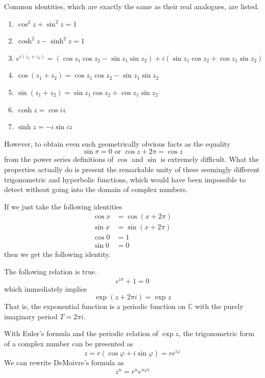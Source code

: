 \documentclass{article}
\begin{document}
    \begin{lemma}
      Common identities, which are exactly the same as their real analogues, are listed. 
      \begin{enumerate}
        \item $\cos^2{z} + \sin^2 {z} = 1$
        \item $\cosh^2{z} - \sinh^2{z} = 1$ 
        \item $e^{i(z_1 + z_2)} = (\cos{z_1} \cos{z_2} - \sin{z_1} \sin{z_2}) + i (\sin{z_1} \cos{z_2} + \cos{z_1} \sin{z_2})$
        \item $\cos{(z_1 + z_2)} = \cos{z_1} \cos{z_2} - \sin{z_1} \sin{z_2}$
        \item $\sin{(z_1 + z_2)} = \sin{z_1} \cos{z_2} + \cos{z_1} \sin{z_2}$
        \item $\cosh{z} = \cos{iz}$ 
        \item $\sinh{z} = -i \sin{iz}$
      \end{enumerate}
    \end{lemma}

    However, to obtain even such geometrically obvious facts as the equality
    \[\sin{\pi} = 0 \text{ or } \cos{z + 2\pi} = \cos{z}\]
    from the power series definitions of $\cos$ and $\sin$ is extremely difficult. What the properties actually do is present the remarkable unity of these seemingly different trigonometric and hyperbolic functions, which would have been impossible to detect without going into the domain of complex numbers. 

    If we just take the following identities
    \begin{align*}
        \cos{x} & = \cos{(x + 2 \pi)} \\
        \sin{x} & = \sin{(x + 2\pi)} \\
        \cos{0} & = 1 \\
        \sin{0} & = 0
    \end{align*}
    then we get the following identity. 

    \begin{theorem}
    The following relation is true. 
    \[e^{i\pi} + 1 = 0\]
    which immediately implies 
    \[\exp(z + 2\pi i) = \exp{z}\]
    That is, the exponential function is a periodic function on $\mathbb{C}$ with the purely imaginary period $T = 2 \pi i$. 
    \end{theorem}

    \begin{corollary}
    With Euler's formula and the periodic relation of $\exp{z}$, the trigonometric form of a complex number can be presented as
    \[z = r(\cos{\varphi} + i \sin{\varphi}) = r e^{i \varphi}\]
    We can rewrite DeMoivre's formula as
    \[z^n = r^n e^{n \varphi i}\]
    \end{corollary}
\end{document}
